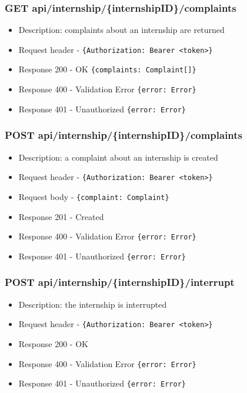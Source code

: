 \subsubsection{GET api/internship/\{internshipID\}/complaints}
\begin{itemize}
    \item Description: complaints about an internship are returned
    \item Request header - \verb|{Authorization: Bearer <token>}|
    \item Response 200 - OK \verb|{complaints: Complaint[]}|
    \item Response 400 - Validation Error \verb|{error: Error}|
    \item Response 401 - Unauthorized \verb|{error: Error}|
\end{itemize}

\subsubsection{POST api/internship/\{internshipID\}/complaints}
\begin{itemize}
    \item Description: a complaint about an internship is created
    \item Request header - \verb|{Authorization: Bearer <token>}|
    \item Request body - \verb|{complaint: Complaint}|
    \item Response 201 - Created
    \item Response 400 - Validation Error \verb|{error: Error}|
    \item Response 401 - Unauthorized \verb|{error: Error}|
\end{itemize}

\subsubsection{POST api/internship/\{internshipID\}/interrupt}
\begin{itemize}
    \item Description: the internship is interrupted
    \item Request header - \verb|{Authorization: Bearer <token>}|
    \item Response 200 - OK
    \item Response 400 - Validation Error \verb|{error: Error}|
    \item Response 401 - Unauthorized \verb|{error: Error}|
\end{itemize}

